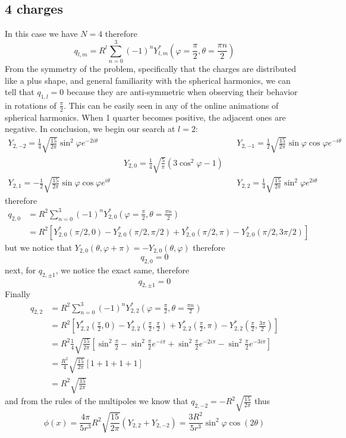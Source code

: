 \subsection{4 charges}
In this case we have \(N=4\) therefore
\begin{equation}
  q_{l,m}=R^l\sum\limits_{n=0}^{3}{(-1)}^n Y^*_{l,m}(\varphi=\frac{\pi}{2},\theta=\frac{\pi n}{2})
\end{equation}
From the symmetry of the problem, specifically that the charges are distributed like a plus shape, and general familiarity with the spherical harmonics, we can tell that \(q_{1,l}=0\) because they are anti-symmetric when observing their behavior in rotations of \(\frac{\pi}{2}\). This can be easily seen in any of the online animations of spherical harmonics. When 1 quarter becomes positive, the adjacent ones are negative. In conclusion, we begin our search at \(l=2\):
\begin{align}
	Y_{2,-2}= \frac{1}{4}\sqrt{\frac{15}{2\pi}}\sin^2\varphi e^{-2i\theta}&& && Y_{2,-1}=\frac{1}{2}\sqrt{\frac{15}{2\pi}}\sin\varphi\cos\varphi e^{-i\theta} \\ 
	&&Y_{2,0}=\frac{1}{4}\sqrt{\frac{5}{\pi}}(3\cos^2\varphi-1)\\
	Y_{2,1} = -\frac{1}{2}\sqrt{\frac{15}{2\pi}}\sin\varphi\cos\varphi e^{i\theta} && && Y_{2,2} = \frac{1}{4}\sqrt{\frac{15}{2\pi}}\sin^2\varphi e^{2i\theta}
\end{align}
therefore
\begin{align}
	q_{2,0} &= R^2\sum\limits_{n=0}^{3}{(-1)}^n Y^*_{2,0}(\varphi=\frac{\pi}{2},\theta=\frac{\pi n}{2})\\
	&= R^2\left[Y^*_{2,0}(\pi/2,0)-Y^*_{2,0}(\pi/2,\pi/2)+Y^*_{2,0}(\pi/2,\pi)-Y^*_{2,0}(\pi/2,3\pi/2)\right]
\end{align}
but we notice that \(Y_{2,0}(\theta,\varphi+\pi)=-Y_{2,0}(\theta,\varphi)\) therefore
\begin{equation}
  q_{2,0} = 0
\end{equation}
next, for \(q_{2,\pm 1}\), we notice the exact same, therefore 
\begin{equation}
  q_{2,\pm 1}=0
\end{equation}
Finally
\begin{align}
	q_{2,2} &= R^2\sum\limits_{n=0}^{3}{(-1)}^n Y^*_{2,2}(\varphi=\frac{\pi}{2},\theta=\frac{\pi n}{2})\\
	&= R^2\left[Y^*_{2,2}(\frac{\pi}{2},0)-Y^*_{2,2}(\frac{\pi}{2},\frac{\pi}{2})+Y^*_{2,2}(\frac{\pi}{2},\pi)-Y^*_{2,2}(\frac{\pi}{2},\frac{3\pi}{2})\right]\\
	&= R^2\frac{1}{4}\sqrt{\frac{15}{2\pi}}\left[\sin^2\frac{\pi}{2}-\sin^2\frac{\pi}{2} e^{-i\pi}+\sin^2\frac{\pi}{2} e^{-2i\pi}-\sin^2\frac{\pi}{2} e^{-3i\pi}\right]\\
	&= \frac{R^2}{4}\sqrt{\frac{15}{2\pi}}\left[1+1+1+1\right]\\
	&= R^2\sqrt{\frac{15}{2\pi}}
\end{align}
and from the rules of the multipoles we know that \(q_{2,-2}=-R^2\sqrt{\frac{15}{2\pi}}\) thus
\begin{equation}
  \phi(x)=\frac{4\pi}{5r^3}R^2\sqrt{\frac{15}{2\pi}}(Y_{2,2}+Y_{2,-2})=\frac{3R^2}{5r^3}\sin^2\varphi\cos(2\theta)
\end{equation}
